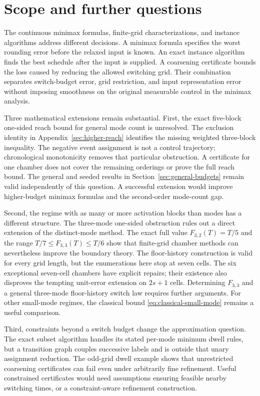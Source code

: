 \section{Scope and further questions}\label{sec:discussion}

The continuous minimax formulas, finite-grid characterizations, and instance
algorithms address different decisions. A minimax formula specifies the worst
rounding error before the relaxed input is known. An exact instance algorithm
finds the best schedule after the input is supplied. A coarsening certificate
bounds the loss caused by reducing the allowed switching grid. Their
combination separates switch-budget error, grid restriction, and input
representation error without imposing smoothness on the original measurable
control in the minimax analysis.

Three mathematical extensions remain substantial. First, the exact
five-block one-sided reach bound for general mode count is unresolved. The
exclusion identity in Appendix~\ref{sec:higher-reach} identifies the missing
weighted three-block inequality. The negative event assignment is not a
control trajectory; chronological monotonicity removes that particular
obstruction. A certificate for one chamber does not cover the remaining
orderings or prove the full reach bound. The general and seeded results in
Section~\ref{sec:general-budgets} remain valid independently of this question.
A successful extension would improve higher-budget minimax formulas and the
second-order mode-count gap.

Second, the regime with as many or more activation blocks than modes has a
different structure. The three-mode one-sided obstruction rules out a direct
extension of the distinct-mode method. The exact full value $F_{3,2}(T)=T/5$
and the range $T/7\le F_{3,3}(T)\le T/6$ show that finite-grid chamber methods
can nevertheless improve the boundary theory. The floor-history construction
is valid for every grid length, but the enumerations here stop at seven cells.
The six exceptional seven-cell chambers have explicit repairs; their existence
also disproves the tempting unit-error extension on $2s+1$ cells. Determining
$F_{3,3}$ and a general three-mode floor-history switch law requires further
arguments. For other small-mode regimes, the classical bound
\eqref{eq:classical-small-mode} remains a useful comparison.

Third, constraints beyond a switch budget change the approximation question.
The exact subset algorithm handles its stated per-mode minimum dwell rules,
but a transition graph couples successive labels and is outside that unary
assignment reduction. The odd-grid dwell example shows that unrestricted
coarsening certificates can fail even under arbitrarily fine refinement.
Useful constrained certificates would need assumptions ensuring feasible
nearby switching times, or a constraint-aware refinement construction.


